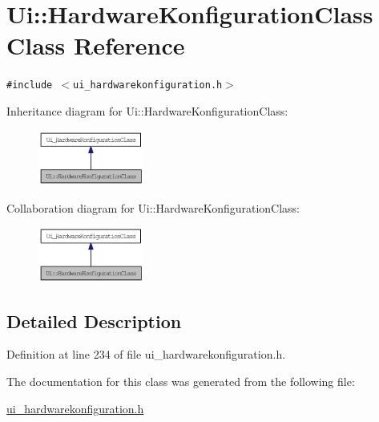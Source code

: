 \hypertarget{class_ui_1_1_hardware_konfiguration_class}{
\section{Ui::HardwareKonfigurationClass Class Reference}
\label{class_ui_1_1_hardware_konfiguration_class}
}
{\tt \#include $<$ui\_\-hardwarekonfiguration.h$>$}

Inheritance diagram for Ui::HardwareKonfigurationClass:\nopagebreak
\begin{figure}[H]
\begin{center}
\leavevmode
\includegraphics[width=98pt]{class_ui_1_1_hardware_konfiguration_class__inherit__graph}
\end{center}
\end{figure}
Collaboration diagram for Ui::HardwareKonfigurationClass:\nopagebreak
\begin{figure}[H]
\begin{center}
\leavevmode
\includegraphics[width=98pt]{class_ui_1_1_hardware_konfiguration_class__coll__graph}
\end{center}
\end{figure}


\subsection{Detailed Description}


Definition at line 234 of file ui\_\-hardwarekonfiguration.h.

The documentation for this class was generated from the following file:\begin{CompactItemize}
\item 
\hyperlink{ui__hardwarekonfiguration_8h}{ui\_\-hardwarekonfiguration.h}\end{CompactItemize}
